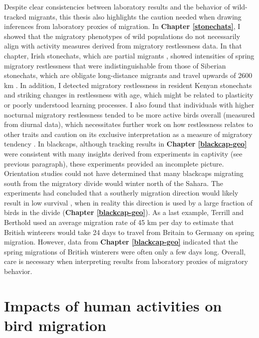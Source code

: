 \documentclass[a4paper, nobind]{templates/ociamthesis}
\begin{document}
Despite clear consistencies between laboratory results and the behavior of wild-tracked migrants, this thesis also highlights the caution needed when drawing inferences from laboratory proxies of migration. In \textbf{Chapter \ref{stonechats}}, I showed that the migratory phenotypes of wild populations do not necessarily align with activity measures derived from migratory restlessness data. In that chapter, Irish stonechats, which are partial migrants \autocite[migratory individuals from Britain travel a median distance of 1139 km,][]{helmMovementsEuropeanStonechats2006}, showed intensities of spring migratory restlessness that were indistinguishable from those of Siberian stonechats, which are obligate long-distance migrants and travel upwards of 2600 km \autocite{raessContinentalEffortsMigration2008}. In addition, I detected migratory restlessness in resident Kenyan stonechats and striking changes in restlessness with age, which might be related to plasticity or poorly understood learning processes. I also found that individuals with higher nocturnal migratory restlessness tended to be more active birds overall (measured from diurnal data), which necessitates further work on how restlessness relates to other traits and caution on its exclusive interpretation as a measure of migratory tendency \autocite[e.g.~][]{bertholdEvolutionaryAspectsMigratory1988}. In blackcaps, although tracking results in \textbf{Chapter \ref{blackcap-geo}} were consistent with many insights derived from experiments in captivity (see previous paragraph), these experiments provided an incomplete picture. Orientation studies could not have determined that many blackcaps migrating south from the migratory divide would winter north of the Sahara. The experiments had concluded that a southerly migration direction would likely result in low survival \autocite{helbigInheritanceMigratoryDirection1991}, when in reality this direction is used by a large fraction of birds in the divide (\textbf{Chapter \ref{blackcap-geo}}). As a last example, Terrill and Berthold \autocite*{terrillEcophysiologicalAspectsRapid1990} used an average migration rate of 45 km per day to estimate that British winterers would take 24 days to travel from Britain to Germany on spring migration. However, data from \textbf{Chapter \ref{blackcap-geo}} indicated that the spring migrations of British winterers were often only a few days long. Overall, care is necessary when interpreting results from laboratory proxies of migratory behavior.

\hypertarget{impacts-of-human-activities-on-bird-migration}{%
\section*{Impacts of human activities on bird migration}\label{impacts-of-human-activities-on-bird-migration}}
\end{document}

